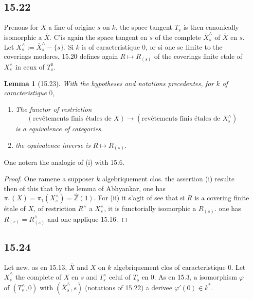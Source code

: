 \documentclass[12pt,a4paper]{article}
\theoremstyle{plain}
\newtheorem{lemma}[theorem]{Lemma}
\theoremstyle{definition}
\theoremstyle{remark}
\newcommand{\bZ}{\mathbb{Z}}
\begin{document}
\subsection*{15.22}

Prenons for $\overline{X}$ a line of origine $s$ on $k$. the space tangent $T_s$ is then canonically isomorphic a $\overline{X}$. C'is again the space tangent en $s$ of the complete $\overline{X}_s^\wedge$ of $\overline{X}$ en $s$. Let $X_s^\wedge := \overline{X}_s^\wedge - \{s\}$. Si $k$ is of caracteristique $0$, or si one se limite to the coverings moderes, 15.20 defines again $R \mapsto R_{(s)}$ of the coverings finite etale of $X_s^\wedge$ in ceux of $T_s^0$.

\begin{lemma}[15.23]
With the hypotheses and notations precedentes, for $k$ of caracteristique $0$,
\begin{enumerate}[label=(\roman*), nosep]
\item The functor of restriction
\[
(\text{revêtements finis étales de } X) \to (\text{revêtements finis étales de } X_s^\wedge)
\]
is a equivalence of categories.
\item the equivalence inverse is $R \mapsto R_{(s)}$.
\end{enumerate}
\end{lemma}

One notera the analogie of (i) with 15.6.

\begin{proof}
One ramene a supposer $k$ algebriquement clos. the assertion (i) resulte then of this that by the lemma of Abhyankar, one has $\pi_1(X) = \pi_1(X_s^\wedge) = \hat{\bZ}(1)$. For (ii) it s'agit of see that si $R$ is a covering finite étale of $X$, of restriction $R^\wedge$ a $X_s^\wedge$, it is functorially isomorphic a $R_{(s)}$. one has $R_{(s)} = R^\wedge_{(s)}$ and one applique 15.16.
\end{proof}

\subsection*{15.24}

Let new, as en 15.13, $\overline{X}$ and $X$ on $k$ algebriquement clos of caracteristique $0$. Let $\overline{X}_s^\wedge$ the complete of $\overline{X}$ en $s$ and $T_s^\wedge$ celui of $T_s$ en $0$. As en 15.3, a isomorphism $\varphi$ of $(T_s^\wedge, 0)$ with $(\overline{X}_s^\wedge, s)$ (notations of 15.22) a derivee $\varphi'(0) \in k^*$.
\end{document}
